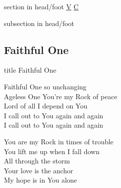 \documentclass{beamer}
\begin{document}
{
{ 
 {
 \begin{beamercolorbox}[ht=4.5ex,dp=1.5ex,%
      leftskip=.3cm,rightskip=.3cm plus1fil]{section in head/foot}
 \fontsize{12}{25}\selectfont 
\hyperlink{Faithful One[]V}{V}
\hyperlink{Faithful One[]C}{C}
 
 \end{beamercolorbox}%
  \begin{beamercolorbox}[ht=2.5ex,dp=1.125ex,%
   leftskip=.3cm,rightskip=.3cm plus1fil]{subsection in head/foot}
   \insertauthor
 \end{beamercolorbox}%
 }
}
\subsection{ Faithful One }

\hypertarget{Faithful One[]}{}
\begin{frame}{}
 \vfill
  \centering
  \begin{beamercolorbox}[sep=8pt,center,shadow=true,rounded=true]{title}
    Faithful One    
  \end{beamercolorbox}
  \vfill
\end{frame}

\hypertarget{Faithful One[]V}{}
\begin{frame}{}
\fontsize{ 20 }{ 27 }\selectfont

Faithful One so unchanging\\ 
Ageless One You're my Rock of peace\\ 
Lord of all I depend on You\\ 
I call out to You again and again\\ 
I call out to You again and again 

\end{frame}

\hypertarget{Faithful One[]C}{}
\begin{frame}{}
\fontsize{ 20 }{ 27 }\selectfont

You are my Rock in times of trouble\\ 
You lift me up when I fall down\\ 
All through the storm\\ 
Your love is the anchor\\ 
My hope is in You alone 

\end{frame}

}
\end{document}
